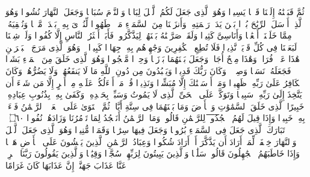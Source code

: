 \startbuffer[\q:25:46]
ثُمَّ قَبَضۡنَٰهُ إِلَیۡنَا قَبۡضࣰا یَسِیرࣰا%
\stopbuffer%
\startbuffer[\q:25:47]
وَهُوَ ٱلَّذِی جَعَلَ لَكُمُ ٱلَّیۡلَ لِبَاسࣰا وَٱلنَّوۡمَ سُبَاتࣰا وَجَعَلَ ٱلنَّهَارَ نُشُورࣰا%
\stopbuffer%
\startbuffer[\q:25:48]
وَهُوَ ٱلَّذِیۤ أَرۡسَلَ ٱلرِّیَٰحَ بُشۡرَۢا بَیۡنَ یَدَیۡ رَحۡمَتِهِۦۚ وَأَنزَلۡنَا مِنَ ٱلسَّمَاۤءِ مَاۤءࣰ طَهُورࣰا%
\stopbuffer%
\startbuffer[\q:25:49]
لِّنُحۡۦِیَ بِهِۦ بَلۡدَةࣰ مَّیۡتࣰا وَنُسۡقِیَهُۥ مِمَّا خَلَقۡنَاۤ أَنۡعَٰمࣰا وَأَنَاسِیَّ كَثِیرࣰا%
\stopbuffer%
\startbuffer[\q:25:50]
وَلَقَدۡ صَرَّفۡنَٰهُ بَیۡنَهُمۡ لِیَذَّكَّرُوا۟ فَأَبَىٰۤ أَكۡثَرُ ٱلنَّاسِ إِلَّا كُفُورࣰا%
\stopbuffer%
\startbuffer[\q:25:51]
وَلَوۡ شِئۡنَا لَبَعَثۡنَا فِی كُلِّ قَرۡیَةࣲ نَّذِیرࣰا%
\stopbuffer%
\startbuffer[\q:25:52]
فَلَا تُطِعِ ٱلۡكَٰفِرِینَ وَجَٰهِدۡهُم بِهِۦ جِهَادࣰا كَبِیرࣰا%
\stopbuffer%
\startbuffer[\q:25:53]
۞ وَهُوَ ٱلَّذِی مَرَجَ ٱلۡبَحۡرَیۡنِ هَٰذَا عَذۡبࣱ فُرَاتࣱ وَهَٰذَا مِلۡحٌ أُجَاجࣱ وَجَعَلَ بَیۡنَهُمَا بَرۡزَخࣰا وَحِجۡرࣰا مَّحۡجُورࣰا%
\stopbuffer%
\startbuffer[\q:25:54]
وَهُوَ ٱلَّذِی خَلَقَ مِنَ ٱلۡمَاۤءِ بَشَرࣰا فَجَعَلَهُۥ نَسَبࣰا وَصِهۡرࣰاۗ وَكَانَ رَبُّكَ قَدِیرࣰا%
\stopbuffer%
\startbuffer[\q:25:55]
وَیَعۡبُدُونَ مِن دُونِ ٱللَّهِ مَا لَا یَنفَعُهُمۡ وَلَا یَضُرُّهُمۡۗ وَكَانَ ٱلۡكَافِرُ عَلَىٰ رَبِّهِۦ ظَهِیرࣰا%
\stopbuffer%
\startbuffer[\q:25:56]
وَمَاۤ أَرۡسَلۡنَٰكَ إِلَّا مُبَشِّرࣰا وَنَذِیرࣰا%
\stopbuffer%
\startbuffer[\q:25:57]
قُلۡ مَاۤ أَسۡءَلُكُمۡ عَلَیۡهِ مِنۡ أَجۡرٍ إِلَّا مَن شَاۤءَ أَن یَتَّخِذَ إِلَىٰ رَبِّهِۦ سَبِیلࣰا%
\stopbuffer%
\startbuffer[\q:25:58]
وَتَوَكَّلۡ عَلَى ٱلۡحَیِّ ٱلَّذِی لَا یَمُوتُ وَسَبِّحۡ بِحَمۡدِهِۦۚ وَكَفَىٰ بِهِۦ بِذُنُوبِ عِبَادِهِۦ خَبِیرًا%
\stopbuffer%
\startbuffer[\q:25:59]
ٱلَّذِی خَلَقَ ٱلسَّمَٰوَٰتِ وَٱلۡأَرۡضَ وَمَا بَیۡنَهُمَا فِی سِتَّةِ أَیَّامࣲ ثُمَّ ٱسۡتَوَىٰ عَلَى ٱلۡعَرۡشِۖ ٱلرَّحۡمَٰنُ فَسۡءَلۡ بِهِۦ خَبِیرࣰا%
\stopbuffer%
\startbuffer[\q:25:60]
وَإِذَا قِیلَ لَهُمُ ٱ̅سۡ̅جُ̅دُ̅و̅ا۟̅ لِلرَّحۡمَٰنِ قَالُوا۟ وَمَا ٱلرَّحۡمَٰنُ أَنَسۡجُدُ لِمَا تَأۡمُرُنَا وَزَادَهُمۡ نُفُورࣰا ۝٦٠ ۩%
\stopbuffer%
\startbuffer[\q:25:61]
تَبَارَكَ ٱلَّذِی جَعَلَ فِی ٱلسَّمَاۤءِ بُرُوجࣰا وَجَعَلَ فِیهَا سِرَٰجࣰا وَقَمَرࣰا مُّنِیرࣰا%
\stopbuffer%
\startbuffer[\q:25:62]
وَهُوَ ٱلَّذِی جَعَلَ ٱلَّیۡلَ وَٱلنَّهَارَ خِلۡفَةࣰ لِّمَنۡ أَرَادَ أَن یَذَّكَّرَ أَوۡ أَرَادَ شُكُورࣰا%
\stopbuffer%
\startbuffer[\q:25:63]
وَعِبَادُ ٱلرَّحۡمَٰنِ ٱلَّذِینَ یَمۡشُونَ عَلَى ٱلۡأَرۡضِ هَوۡنࣰا وَإِذَا خَاطَبَهُمُ ٱلۡجَٰهِلُونَ قَالُوا۟ سَلَٰمࣰا%
\stopbuffer%
\startbuffer[\q:25:64]
وَٱلَّذِینَ یَبِیتُونَ لِرَبِّهِمۡ سُجَّدࣰا وَقِیَٰمࣰا%
\stopbuffer%
\startbuffer[\q:25:65]
وَٱلَّذِینَ یَقُولُونَ رَبَّنَا ٱصۡرِفۡ عَنَّا عَذَابَ جَهَنَّمَۖ إِنَّ عَذَابَهَا كَانَ غَرَامًا%
